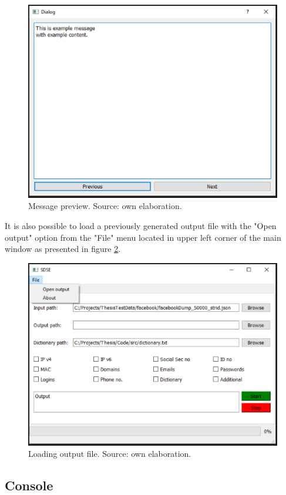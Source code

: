 \documentclass[a4paper,twoside,12pt]{book}
\begin{document}
\begin{figure}
\centering
\includegraphics{Images/MessagePrev}
\caption{Message preview. Source: own elaboration.}
\label{fig:MessagePrev}
\end{figure}

It is also possible to load a previously generated output file with the "Open output" option from the
"File" menu located in upper left corner of the main window as presented in figure \ref{fig:OpeningOutput}.

\begin{figure}
\centering
\includegraphics{Images/OpeningOutput}
\caption{Loading output file. Source: own elaboration.}
\label{fig:OpeningOutput}
\end{figure}

\subsection{Console}
\end{document}
